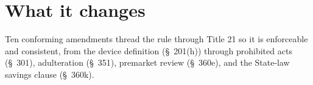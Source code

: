 \section{What it changes}
\label{sec:c}

Ten conforming amendments thread the rule through Title 21 so it is enforceable and consistent, from the device definition (\S~201(h)) through prohibited acts (\S~301), adulteration (\S~351), premarket review (\S~360e), and the State-law savings clause (\S~360k).
